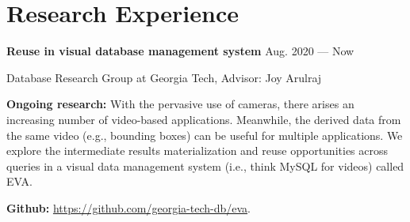 \section{Research Experience}

\parbox[t][][t]{\linewidth}{
  \parbox{\linewidth}{\textbf{Reuse in visual database management system}
		\hfill {{Aug. 2020 --- Now}}}
	\parbox{\linewidth}{Database Research Group at Georgia Tech, Advisor: Joy Arulraj}
		\smallbreak
  \textbf{Ongoing research:} With the pervasive use of cameras, there arises an increasing number of video-based applications. Meanwhile, the derived data from the same video (e.g., bounding boxes) can be useful for multiple applications. We explore the intermediate results materialization and reuse opportunities across queries in a visual data management system (i.e., think MySQL for videos) called EVA.

  \textbf{Github:} \url{https://github.com/georgia-tech-db/eva}.
	\bigskip
}


